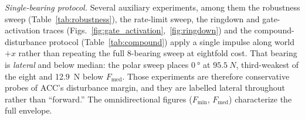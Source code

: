 \documentclass[a4paper,fleqn]{cas-dc}
\begin{document}
\emph{Single-bearing protocol.} Several auxiliary experiments, among them the robustness sweep (Table~\ref{tab:robustness}), the rate-limit sweep, the ringdown and gate-activation traces (Figs.~\ref{fig:gate_activation},~\ref{fig:ringdown}) and the compound-disturbance protocol (Table~\ref{tab:compound}) apply a single impulse along world $+x$ rather than repeating the full \num{8}-bearing sweep at eightfold cost. That bearing is \emph{lateral} and below median: the polar sweep places $\SI{0}{\degree}$ at $\SI{95.5}{N}$, third-weakest of the eight and \SI{12.9}{N} below $F_{\text{med}}$. Those experiments are therefore conservative probes of ACC's disturbance margin, and they are labelled lateral throughout rather than ``forward.'' The omnidirectional figures ($F_{\min}$, $F_{\text{med}}$) characterize the full envelope.
\end{document}

